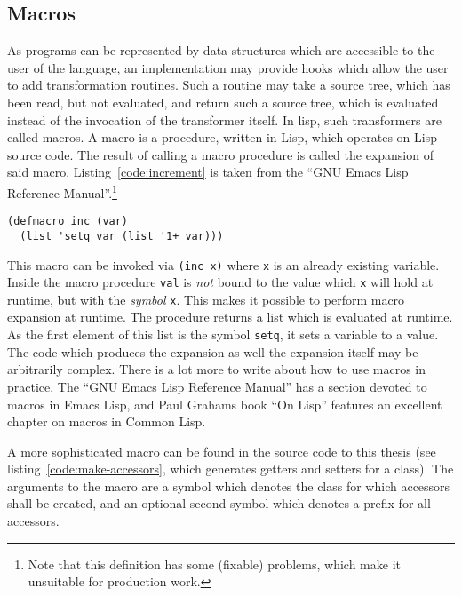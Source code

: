 \documentclass[a4paper,10pt,twoside]{report}
\newcommand{\el}{Emacs Lisp}
\newcommand{\cl}{Common Lisp}
\newcommand{\sym}[1]{\texttt{#1}}
\begin{document}
\subsection{Macros}
\label{subsec:macros}

As programs can be represented by data structures which are accessible to the
user of the language, an implementation may provide hooks which allow the user
to add transformation routines.  Such a routine may take a source tree, which
has been read, but not evaluated, and return such a source tree, which is
evaluated instead of the invocation of the transformer itself.  In lisp, such
transformers are called macros.  A macro is a procedure, written in Lisp, which
operates on Lisp source code.  The result of calling a macro procedure is called
the expansion of said macro.  Listing~\ref{code:increment} is taken from the
``GNU Emacs Lisp Reference Manual''.\footnote{Note that this definition has some
  (fixable) problems, which make it unsuitable for production work.}

\pagebreak

\begin{lstlisting}[style=lispcode,caption={Increment as a
      macro.},label={code:increment}]
(defmacro inc (var)
  (list 'setq var (list '1+ var)))
\end{lstlisting}

This macro can be invoked via \texttt{(inc x)} where \sym{x} is an already
existing variable.  Inside the macro procedure \sym{val} is \emph{not} bound to
the value which \sym{x} will hold at runtime, but with the \emph{symbol}
\sym{x}.  This makes it possible to perform macro expansion at runtime.  The
procedure returns a list which is evaluated at runtime.  As the first element of
this list is the symbol \sym{setq}, it sets a variable to a value.  The code
which produces the expansion as well the expansion itself may be arbitrarily
complex.  There is a lot more to write about how to use macros in practice.  The
``GNU Emacs Lisp Reference Manual'' has a section devoted to macros in \el, and
Paul Grahams book ``On Lisp'' \cite{on-lisp} features an excellent chapter on
macros in \cl{}.

A more sophisticated macro can be found in the source code to this thesis (see
listing~\ref{code:make-accessors}, which generates getters and setters for a
class).  The arguments to the macro are a symbol which denotes the class for
which accessors shall be created, and an optional second symbol which denotes a
prefix for all accessors.
\end{document}
